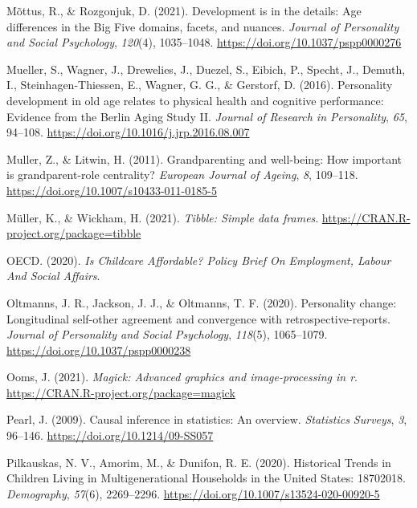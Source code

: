 \documentclass[
  english,
  man,floatsintext]{apa7}
\begin{document}
\leavevmode\hypertarget{ref-mottusDevelopmentDetailsAge2021}{}%
Mõttus, R., \& Rozgonjuk, D. (2021). Development is in the details: Age differences in the Big Five domains, facets, and nuances. \emph{Journal of Personality and Social Psychology}, \emph{120}(4), 1035--1048. \url{https://doi.org/10.1037/pspp0000276}

\leavevmode\hypertarget{ref-muellerPersonalityDevelopmentOld2016}{}%
Mueller, S., Wagner, J., Drewelies, J., Duezel, S., Eibich, P., Specht, J., Demuth, I., Steinhagen-Thiessen, E., Wagner, G. G., \& Gerstorf, D. (2016). Personality development in old age relates to physical health and cognitive performance: Evidence from the Berlin Aging Study II. \emph{Journal of Research in Personality}, \emph{65}, 94--108. \url{https://doi.org/10.1016/j.jrp.2016.08.007}

\leavevmode\hypertarget{ref-mullerGrandparentingWellbeingHow2011}{}%
Muller, Z., \& Litwin, H. (2011). Grandparenting and well-being: How important is grandparent-role centrality? \emph{European Journal of Ageing}, \emph{8}, 109--118. \url{https://doi.org/10.1007/s10433-011-0185-5}

\leavevmode\hypertarget{ref-R-tibble}{}%
Müller, K., \& Wickham, H. (2021). \emph{Tibble: Simple data frames}. \url{https://CRAN.R-project.org/package=tibble}

\leavevmode\hypertarget{ref-oecdChildcareAffordablePolicy2020}{}%
OECD. (2020). \emph{Is Childcare Affordable? Policy Brief On Employment, Labour And Social Affairs}.

\leavevmode\hypertarget{ref-oltmannsPersonalityChangeLongitudinal2020}{}%
Oltmanns, J. R., Jackson, J. J., \& Oltmanns, T. F. (2020). Personality change: Longitudinal self-other agreement and convergence with retrospective-reports. \emph{Journal of Personality and Social Psychology}, \emph{118}(5), 1065--1079. \url{https://doi.org/10.1037/pspp0000238}

\leavevmode\hypertarget{ref-R-magick}{}%
Ooms, J. (2021). \emph{Magick: Advanced graphics and image-processing in r}. \url{https://CRAN.R-project.org/package=magick}

\leavevmode\hypertarget{ref-pearlCausalInferenceStatistics2009}{}%
Pearl, J. (2009). Causal inference in statistics: An overview. \emph{Statistics Surveys}, \emph{3}, 96--146. \url{https://doi.org/10.1214/09-SS057}

\leavevmode\hypertarget{ref-pilkauskasHistoricalTrendsChildren2020}{}%
Pilkauskas, N. V., Amorim, M., \& Dunifon, R. E. (2020). Historical Trends in Children Living in Multigenerational Households in the United States: 18702018. \emph{Demography}, \emph{57}(6), 2269--2296. \url{https://doi.org/10.1007/s13524-020-00920-5}
\end{document}
